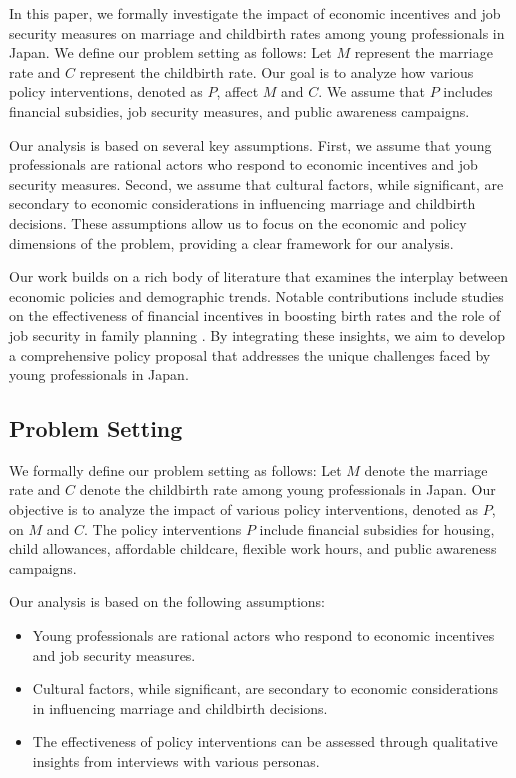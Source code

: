 \documentclass{article} %
\begin{document}
In this paper, we formally investigate the impact of economic incentives and job security measures on marriage and childbirth rates among young professionals in Japan. We define our problem setting as follows: Let \( M \) represent the marriage rate and \( C \) represent the childbirth rate. Our goal is to analyze how various policy interventions, denoted as \( P \), affect \( M \) and \( C \). We assume that \( P \) includes financial subsidies, job security measures, and public awareness campaigns.

Our analysis is based on several key assumptions. First, we assume that young professionals are rational actors who respond to economic incentives and job security measures. Second, we assume that cultural factors, while significant, are secondary to economic considerations in influencing marriage and childbirth decisions. These assumptions allow us to focus on the economic and policy dimensions of the problem, providing a clear framework for our analysis.

Our work builds on a rich body of literature that examines the interplay between economic policies and demographic trends. Notable contributions include studies on the effectiveness of financial incentives in boosting birth rates \citep{liu2023agentbench} and the role of job security in family planning \citep{west2023agent}. By integrating these insights, we aim to develop a comprehensive policy proposal that addresses the unique challenges faced by young professionals in Japan.

\subsection{Problem Setting}
\label{sec:problem_setting}

We formally define our problem setting as follows: Let \( M \) denote the marriage rate and \( C \) denote the childbirth rate among young professionals in Japan. Our objective is to analyze the impact of various policy interventions, denoted as \( P \), on \( M \) and \( C \). The policy interventions \( P \) include financial subsidies for housing, child allowances, affordable childcare, flexible work hours, and public awareness campaigns.

Our analysis is based on the following assumptions:
\begin{itemize}
    \item Young professionals are rational actors who respond to economic incentives and job security measures.
    \item Cultural factors, while significant, are secondary to economic considerations in influencing marriage and childbirth decisions.
    \item The effectiveness of policy interventions can be assessed through qualitative insights from interviews with various personas.
\end{itemize}
\end{document}
